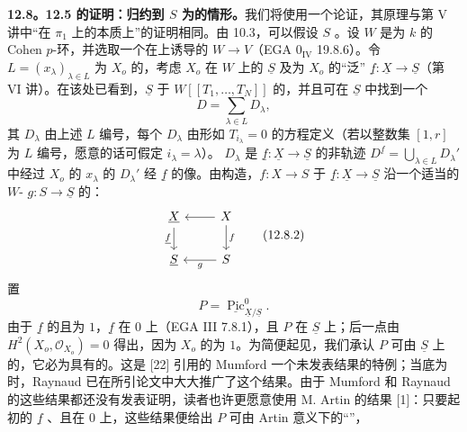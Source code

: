 \textbf{12.8。12.5 的证明：归约到 $S$ 为的情形。}我们将使用一个论证，其原理与第 V 讲中“在 $\pi_1$ 上的本质上”的证明相同。由 10.3，可以假设 $S$ 。设 $W$ 是为 $k$ 的 Cohen $p$-环，并选取一个在上诱导的 $W\to V$（EGA $0_{\mathrm{IV}}$ 19.8.6）。令 $L=(x_\lambda)_{\lambda\in L}$ 为 $X_o$ 的，考虑 $X_o$ 在 $W$ 上的 $\underline S$ 及为 $X_o$ 的“泛” $\underline f:\underline X\to\underline S$（第 VI 讲）。在该处已看到，$\underline S$ 于 $W[[T_1,\ldots,T_N]]$ 的，并且可在 $\underline S$ 中找到一个
\[
 D=\sum_{\lambda\in L}D_\lambda,\tag{12.8.1}
\]
其 $D_\lambda$ 由上述 $L$ 编号，每个 $D_\lambda$ 由形如 $T_{i_\lambda}=0$ 的方程定义（若以整数集 $[1,r]$ 为 $L$ 编号，愿意的话可假定 $i_\lambda=\lambda$）。
$D_\lambda$ 是 $\underline f:\underline X\to\underline S$ 的非轨迹 $D^{\underline f}=\bigcup_{\lambda\in L}D_\lambda'$ 中经过 $X_o$ 的 $x_\lambda$ 的 $D_\lambda'$ 经 $\underline f$ 的像。由构造，$f:X\to S$ 于 $\underline f:\underline X\to\underline S$ 沿一个适当的 $W$- $g:S\to\underline S$ 的：
\[
\begin{tikzcd}
 \underline X\arrow[d,"\underline f"'] & X\arrow[l]\arrow[d,"f"]\\
 \underline S & S\arrow[l,"g"]
\end{tikzcd}\tag{12.8.2}
\]
置
\[
 P=\underline{\operatorname{Pic}}_{\underline X/\underline S}^{0}.\tag{12.8.3}
\]
由于 $\underline f$ 的且为 $1$，$\underline f$ 在 $0$ 上（EGA III 7.8.1），且 $P$ 在 $\underline S$ 上；后一点由 $H^2(X_o,\mathcal O_{X_o})=0$ 得出，因为 $X_o$ 的为 $1$。为简便起见，我们承认 $P$ 可由 $\underline S$ 上的，它必为具有的。这是 [22] 引用的 Mumford 一个未发表结果的特例；当底为时，Raynaud 已在所引论文中大大推广了这个结果。由于 Mumford 和 Raynaud 的这些结果都还没有发表证明，读者也许更愿意使用 M. Artin 的结果 [1]：只要起初的 $\underline f$ 、且在 $0$ 上，这些结果便给出 $P$ 可由 Artin 意义下的“”，
